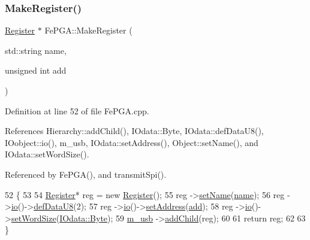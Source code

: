 \subsubsection{\texorpdfstring{Make\+Register()}{MakeRegister()}}
{\footnotesize\ttfamily \hyperlink{classRegister}{Register} $\ast$ Fe\+P\+G\+A\+::\+Make\+Register (\begin{DoxyParamCaption}\item[{std\+::string}]{name,  }\item[{unsigned int}]{add }\end{DoxyParamCaption})\hspace{0.3cm}{\ttfamily [private]}}



Definition at line 52 of file Fe\+P\+G\+A.\+cpp.



References Hierarchy\+::add\+Child(), I\+Odata\+::\+Byte, I\+Odata\+::def\+Data\+U8(), I\+Oobject\+::io(), m\+\_\+usb, I\+Odata\+::set\+Address(), Object\+::set\+Name(), and I\+Odata\+::set\+Word\+Size().



Referenced by Fe\+P\+G\+A(), and transmit\+Spi().


\begin{DoxyCode}
52                                                              \{
53 
54   \hyperlink{classRegister}{Register}* reg = \textcolor{keyword}{new} \hyperlink{classRegister}{Register}();
55   reg   ->\hyperlink{classObject_ae30fea75683c2d149b6b6d17c09ecd0c}{setName}(\hyperlink{classObject_a300f4c05dd468c7bb8b3c968868443c1}{name});
56   reg   ->\hyperlink{classIOobject_af04fb94137c3d86849f478ac5afab5d1}{io}()->\hyperlink{classIOdata_a80bb230b61062b447db5832e43bf7b44}{defDataU8}(2);     
57   reg   ->\hyperlink{classIOobject_af04fb94137c3d86849f478ac5afab5d1}{io}()->\hyperlink{classIOdata_af98cbfbc28346ebb9b64ca0203af1463}{setAddress}(\hyperlink{classAttrib_a235f773af19c900264a190b00a3b4ad7}{add});
58   reg   ->\hyperlink{classIOobject_af04fb94137c3d86849f478ac5afab5d1}{io}()->\hyperlink{classIOdata_a20f30a9f4673713616447b1b5e9817d5}{setWordSize}(\hyperlink{classIOdata_a37c53ebf4bf8d866aac8af572962a84ca00156611f08eeb1b5d361de809dafb8e}{IOdata::Byte});
59   \hyperlink{classFePGA_afb7947e600a66d914ee524acec3d8b1f}{m\_usb} ->\hyperlink{classHierarchy_ad677774ff38fcb257c04a3a10d471fac}{addChild}(reg);
60 
61   \textcolor{keywordflow}{return} reg;
62 
63 \}
\end{DoxyCode}
\mbox{\label{classFePGA_a2bcd2c468fc3e1bcadc9bd8800b325a0}} 
